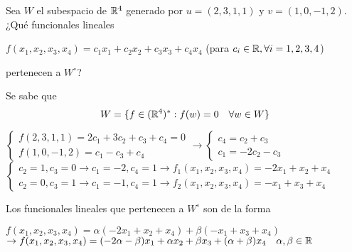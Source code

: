 \item Sea $W$ el subespacio de $\mathbb{R}^4$ generado por $u=(2,3,1,1)$ y $v=(1,0,-1,2)$. ¿Qué funcionales lineales
    \begin{center}
        $f(x_1,x_2,x_3,x_4)=c_1x_1+c_2x_2+c_3x_3+c_4x_4$ (para $c_i\in\mathbb{R}, \forall i=1,2,3,4$)
    \end{center}
    pertenecen a $W^\circ$?
    \begin{mdframed}[style=s]
        Se sabe que \[W=\{f\in(\mathbb{R}^4)^*:f(w)=0\quad \forall w\in W\}\]
        \begin{center}
            $\begin{cases}
                f(2,3,1,1)=2c_1+3c_2+c_3+c_4=0\\
                f(1,0,-1,2)=c_1-c_3+c_4
            \end{cases}\to\begin{cases}
                c_4=c_2+c_3\\
                c_1=-2c_2-c_3
            \end{cases}$\\
            $\begin{cases}
                c_2=1,c_3=0\to c_1=-2,c_4=1\to f_1(x_1,x_2,x_3,x_4)=-2x_1+x_2+x_4\\
                c_2=0,c_3=1\to c_1=-1,c_4=1\to f_2(x_1,x_2,x_3,x_4)=-x_1+x_3+x_4
            \end{cases}$
        \end{center}
        Los funcionales lineales que pertenecen a $W^\circ$ son de la forma 
        \begin{center}
            $f(x_1,x_2,x_3,x_4)=\alpha(-2x_1+x_2+x_4)+\beta(-x_1+x_3+x_4)$\\
            $\to f(x_1,x_2,x_3,x_4)=(-2\alpha-\beta)x_1+\alpha x_2+\beta x_3+ (\alpha+\beta)x_4\quad \alpha,\beta\in\mathbb{R}$
        \end{center}
    \end{mdframed}